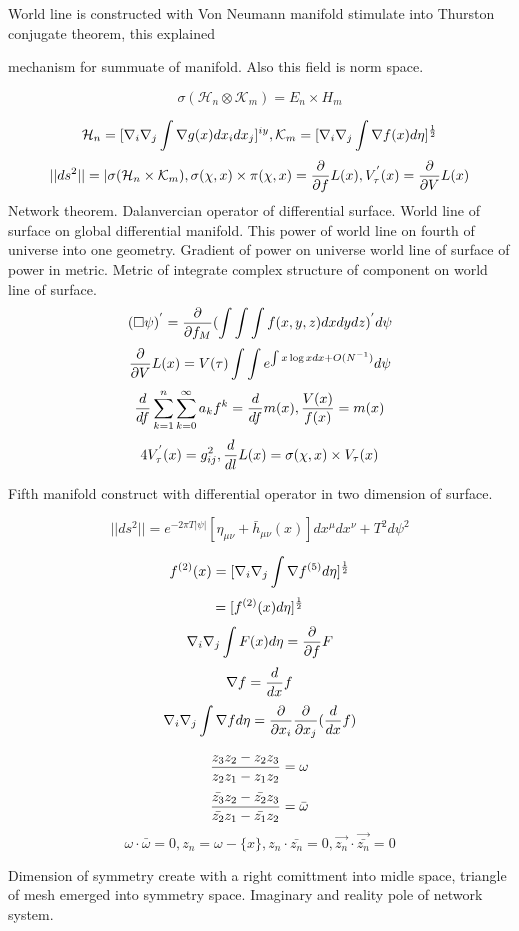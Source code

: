 \documentclass{jsarticle}
\begin{document}
  World line is constructed with Von Neumann manifold stimulate into Thurston conjugate theorem, this explained
  {mechanism for summuate of manifold. Also this field is norm space.

$$ \sigma(\mathcal{H}_n \otimes \mathcal{K}_m) = E_n \times H_m $$

$$ \mathcal{H}_n = [\nabla_{i}\nabla_{j}\int \nabla g(x)dx_i dx_j]^{iy}, \mathcal{K}_m 
= [\nabla_{i}\nabla_{j}\int \nabla f(x) d \eta]^{1 \over 2} $$
$$ ||ds^2|| = |\sigma(\mathcal{H}_n \times \mathcal{K}_m), \sigma(\chi, x) \times \pi(\chi,x) = {\partial 
\over \partial f}L(x), V^{'}_{\tau}(x) = {\partial \over \partial V}L(x) $$
Network theorem. Dalanvercian operator of differential surface. World line of surface on 
global differential manifold. This power of world line on fourth of universe into one geometry.
Gradient of power on universe world line of surface of power in metric.
Metric of integrate complex structure of component on world line of surface.
$$ (\square \psi)^{'} = {\partial \over \partial f_M} (\int \int \int f(x,y,z)dxdydz)^{'}d \psi $$
$$ {\partial \over \partial V}L(x) = V(\tau) \int \int e^{\int x \log x dx + O(N^{-1})}d \psi $$
$$ {d \over df}\sum_{k=1}^{n} \sum_{k=0}^{\infty} a_k f^k = {d \over df}m(x), {V(x) \over f(x)} = m(x) $$
$$ 4 V^{'}_{\tau}(x) = g^2_{ij}, {d \over dl}L(x) = \sigma(\chi,x) \times V_{\tau}(x) $$

  Fifth manifold construct with differential operator in two dimension of surface. 

  $$ ||ds^2|| = e^{-2 \pi T |\psi|}[\eta_{\mu\nu} + \bar{h}_{\mu\nu}(x)]dx^{\mu}dx^{\nu} + T^2 d \psi^2 $$

  $$ f^{(2)}(x) = [\nabla_{i}\nabla_{j}\int \nabla f^{(5)} d \eta]^{1 \over 2} $$
  $$ = [f^{(2)}(x) d \eta]^{1 \over 2} $$
  $$ \nabla_{i}\nabla_{j} \int F(x) d \eta = {\partial \over \partial f}F $$
  $$ \nabla f = {d \over dx}f $$  
  $$ \nabla_{i}\nabla_{j} \int \nabla f d \eta = {\partial \over \partial x_{i}}
  {\partial \over \partial x_{j}} ({d \over dx}f) $$ 


  $$ {z_3 z_2 - z_2 z_3 \over z_2 z_1 - z_1 z_2} = \omega $$
  $$ {\bar{z_3} z_2 - \bar{z_2} z_3 \over \bar{z_2} z_1 - \bar{z_1} z_2} = \bar{\omega} $$
  $$ \omega \cdot \bar{\omega} = 0, z_n = \omega -\{x\}, z_n \cdot \bar{z_n} = 0, \vec{z_n} \cdot \vec{\bar{z_n}} = 0 $$

  Dimension of symmetry create with a right comittment into midle space, triangle of mesh emerged into
symmetry space. Imaginary and reality pole of network system.

}
\end{document}

